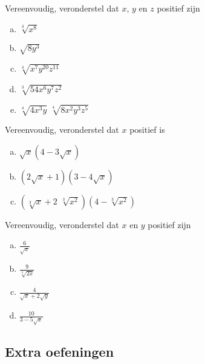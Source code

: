 \documentclass[12pt,twoside]{article}
\begin{document}
\begin{oefening}
  Vereenvoudig, veronderstel dat $x$, $y$ en $z$ positief zijn
  \begin{multicols}{3}
    \begin{enumerate}[(a)]
      \itemsep1em
    \item \(\sqrt[3]{{{x^8}}}\)
    \item \(\sqrt {8{y^3}} \)
    \item \(\sqrt[4]{{{x^7}{y^{20}}{z^{11}}}}\)
    \item \(\sqrt[3]{{54{x^6}{y^7}{z^2}}}\)
    \item \(\sqrt[4]{{4{x^3}y}}\,\,\sqrt[4]{{8{x^2}{y^3}{z^5}}}\)
    \end{enumerate}
  \end{multicols}
\end{oefening}

\begin{oefening}
  Vereenvoudig, veronderstel dat $x$ positief is
  \begin{enumerate}[(a)]
    \itemsep1em
  \item \(\sqrt x \left( {4 - 3\sqrt x } \right)\)
  \item \(\left( {2\sqrt x + 1} \right)\left( {3 - 4\sqrt x } \right)\)
\item \(\left( {\sqrt[3]{x} + 2\,\,\sqrt[3]{{{x^2}}}} \right)\left( {4 - \sqrt[3]{{{x^2}}}} \right)\)
  \end{enumerate}
\end{oefening}

\begin{oefening}
  Vereenvoudig, veronderstel dat $x$ en $y$ positief zijn
  \begin{multicols}{2}
    \begin{enumerate}[(a)]
      \itemsep1em
    \item \(\displaystyle \frac{6}{{\sqrt x }}\)
    \item \(\displaystyle \frac{9}{{\sqrt[3]{{2x}}}}\)
    \item \(\displaystyle \frac{4}{{\sqrt x + 2\sqrt y }}\)
    \item \(\displaystyle \frac{{10}}{{3 - 5\sqrt x }}\)
    \end{enumerate}
  \end{multicols}
\end{oefening}

\needspace{5cm}
\subsection{Extra oefeningen}
\end{document}
